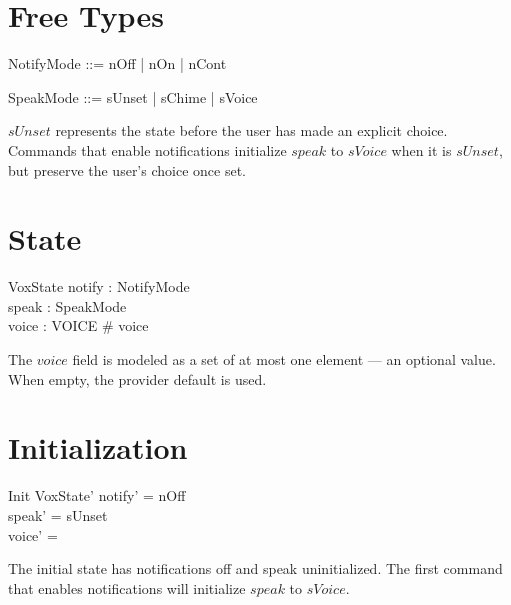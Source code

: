 \documentclass[a4paper,10pt,fleqn]{article}
\begin{document}
\section{Free Types}

\begin{zed}
  NotifyMode ::= nOff | nOn | nCont
\end{zed}

\begin{zed}
  SpeakMode ::= sUnset | sChime | sVoice
\end{zed}

$sUnset$ represents the state before the user has made an
explicit choice. Commands that enable notifications initialize
$speak$ to $sVoice$ when it is $sUnset$, but preserve the
user's choice once set.

\section{State}

\begin{schema}{VoxState}
  notify : NotifyMode \\
  speak : SpeakMode \\
  voice : \power VOICE
  \where
  \# voice 
\end{schema}

The $voice$ field is modeled as a set of at most one element ---
an optional value. When empty, the provider default is used.

\section{Initialization}

\begin{schema}{Init}
  VoxState'
  \where
  notify' = nOff \\
  speak' = sUnset \\
  voice' = \emptyset
\end{schema}

The initial state has notifications off and speak uninitialized.
The first command that enables notifications will initialize
$speak$ to $sVoice$.
\end{document}
